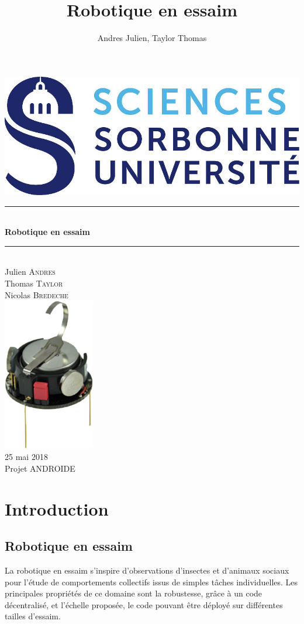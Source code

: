 \documentclass[a4paper]{article}
\title{Robotique en essaim}
\author{Andres Julien, Taylor Thomas}
\newcommand{\HRule}{\rule{\linewidth}{0.5mm}} %
\begin{document}
\begin{titlepage}
\center
\includegraphics{incl/logo_sorbonne}\\[1cm] 

\HRule \\[0.4cm]
{ \huge \bfseries Robotique en essaim}\\[0.4cm] %
\HRule \\[1.5cm]



Julien \textsc{Andres}\\ %
Thomas \textsc{Taylor}\\[3cm]
Nicolas \textsc{Bredeche}\\[2cm]


\includegraphics[width=4cm]{incl/Kilobots.png}\\[2cm]


25 mai 2018\\
Projet ANDROIDE

\end{titlepage}

\newpage
\renewcommand{\contentsname}{Sommaire}
\tableofcontents
\newpage
\section{Introduction}
\subsection{Robotique en essaim}
La robotique en essaim s'inspire d'observations d'insectes et d'animaux sociaux pour l'étude de comportements collectifs issus de simples tâches individuelles. Les principales propriétés de ce domaine sont la robustesse, grâce à un code décentralisé, et l'échelle proposée, le code pouvant être déployé sur différentes tailles d'essaim.
\end{document}
